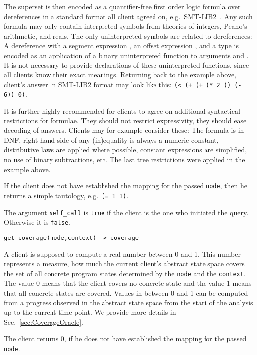 \documentclass[envcountsame]{llncs}
\begin{document}
The superset is then encoded as a quantifier-free first order logic formula over
dereferences in a standard format all client agreed on,
e.g.~SMT-LIB2~\cite{SMTLIBURL}. Any such formula may only contain interpreted
symbols from theories of integers, Peano's arithmetic, and reals. The only
uninterpreted symbols are related to dereferences: A dereference with a segment
expression , an offset expression , and a type  is encoded as an
application of a binary uninterpreted function  to
arguments  and . It is not necessary to provide declarations of these
uninterpreted functions, since all clients know their exact meanings. Returning back to the example above, client's answer in SMT-LIB2 format may look
like this: \texttt{(< (+ (+  (* 2 )) (- 6))
0)}.

It is further highly recommended for clients to agree on additional syntactical
restrictions for formulae. They should not restrict expressivity, they should
ease decoding of answers. Clients may for example consider these: The formula is
in DNF, right hand side of any (in)equality is always a numeric constant,
distributive laws are applied where possible, constant expressions are
simplified, no use of binary subtractions, etc. The last tree restrictions were
applied in the example above.

If the client does not have established the mapping for the passed
\texttt{node}, then he returns a simple tautology, e.g.~\texttt{(= 1 1)}.

The argument \texttt{self\_call} is \texttt{true} if the client is the one who
initiated the query. Otherwise it is \texttt{false}. \newline

\noindent\texttt{get\_coverage(node,context) -> coverage}

A client is supposed to compute a real number between 0 and 1. This number
represents a measure, how much the current client's abstract state space covers
the set of all concrete program states determined by the \texttt{node} and the
\texttt{context}. The value 0 means that the client covers no concrete state and
the value 1 means that all concrete states are covered. Values in-between 0 and
1 can be computed from a progress observed in the abstract state space from
the start of the analysis up to the current time point. We provide more details
in Sec.~\ref{sec:CoverageOracle}.

The client returns 0, if he does not have established the mapping for the passed
\texttt{node}. \newline
\end{document}
